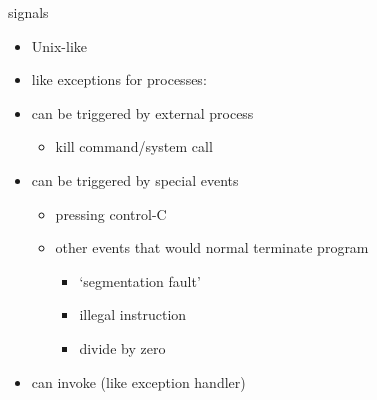 \usetikzlibrary{shapes.callouts,positioning}

\begin{frame}{signals}
\begin{itemize}
\item Unix-like 
\item like exceptions for processes:
\vspace{.5cm}
\item can be triggered by external process
    \begin{itemize}
    \item kill command/system call
    \end{itemize}
\item can be triggered by special events
    \begin{itemize}
    \item pressing control-C
    \item other events that would normal terminate program
        \begin{itemize}
        \item `segmentation fault'
        \item illegal instruction
        \item divide by zero
        \end{itemize}
    \end{itemize}
\item can invoke  (like exception handler)
\end{itemize}
\end{frame}

